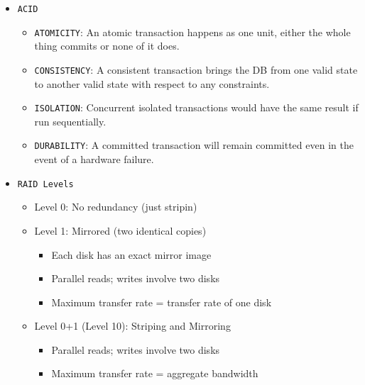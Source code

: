 \documentclass[landscape,8pt]{extarticle}
\newcommand{\code}{\lstinline}
\begin{document}
\footnotesize
\begin{multicols}{4}
    \setlength{\premulticols}{1pt}
    \setlength{\postmulticols}{1pt}
    \setlength{\multicolsep}{1pt}
    \setlength{\columnsep}{2pt}
    \begin{itemize}
        \item \code{ACID}
              \begin{itemize}
                  \item \code{ATOMICITY}: An atomic transaction happens as one unit, either the whole thing
                        commits or none of it does.
                  \item \code{CONSISTENCY}: A consistent transaction brings the DB from one valid state to
                        another valid state with respect to any constraints.
                  \item \code{ISOLATION}: Concurrent isolated transactions would have the same result if run sequentially.
                  \item \code{DURABILITY}: A committed transaction will remain committed even in the event of
                        a hardware failure.
              \end{itemize}
        \item \code{RAID Levels}
              \begin{itemize}
                  \item Level 0: No redundancy (just stripin)
                  \item Level 1: Mirrored (two identical copies)
                        \begin{itemize}
                            \item Each disk has an exact mirror image
                            \item Parallel reads; writes involve two disks
                            \item Maximum transfer rate = transfer rate of one disk
                        \end{itemize}
                  \item Level 0+1 (Level 10): Striping and Mirroring
                        \begin{itemize}
                            \item Parallel reads; writes involve two disks
                            \item Maximum transfer rate = aggregate bandwidth
                        \end{itemize}

\end{itemize}
\end{itemize}
\end{multicols}
\end{document}
